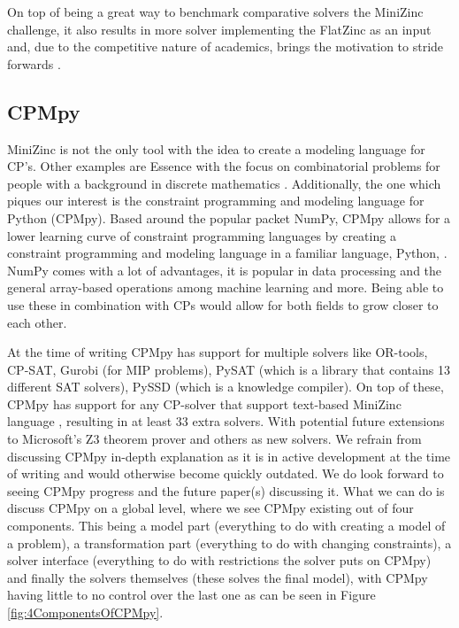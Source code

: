 On top of being a great way to benchmark comparative solvers the MiniZinc challenge, it also results in more solver implementing the FlatZinc as an input and, due to the competitive nature of academics, brings the motivation to stride forwards \cite{59stuckey2010philosophy}.

\subsection{CPMpy}
\label{CP:CPMpy}
MiniZinc is not the only tool with the idea to create a modeling language for CP’s. Other examples are Essence with the focus on combinatorial problems for people with a background in discrete mathematics \cite{70frisch2008essence}.
Additionally, the one which piques our interest is the constraint programming and modeling language for Python (CPMpy). Based around the popular packet NumPy, CPMpy allows for a lower learning curve of constraint programming languages by creating a constraint programming and modeling language in a familiar language, Python, \cite{17guns2019increasing}. NumPy comes with a lot of advantages, it is popular in data processing and the general array-based operations among machine learning and more. 
Being able to use these in combination with CPs would allow for both fields to grow closer to each other. 


At the time of writing CPMpy has support for multiple solvers like OR-tools, CP-SAT, Gurobi (for MIP problems), PySAT (which is a library that contains 13 different SAT solvers), PySSD (which is a knowledge compiler). On top of these, CPMpy has support for any CP-solver that support text-based MiniZinc language \cite{CPMpyDoc, CPMpyGithub}, resulting in at least 33 extra solvers. With potential future extensions to Microsoft’s Z3 theorem prover and others as new solvers. 
We refrain from discussing CPMpy in-depth explanation as it is in active development at the time of writing and would otherwise become quickly outdated.
We do look forward to seeing CPMpy progress and the future paper(s) discussing it. What we can do is discuss CPMpy on a global level, where we see CPMpy existing out of four components. This being a model part (everything to do with creating a model of a problem), a transformation part (everything to do with changing constraints), a solver interface (everything to do with restrictions the solver puts on CPMpy) and finally the solvers themselves (these solves the final model), with CPMpy having little to no control over the last one as can be seen in Figure \ref{fig:4ComponentsOfCPMpy}.

